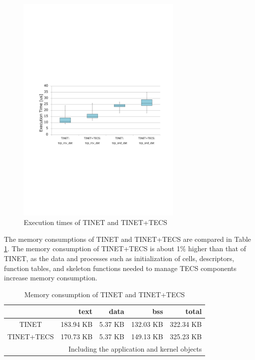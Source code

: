 \documentclass[JIP]{ipsj_v2/UTF8/ipsj}
\begin{document}
\begin{figure}[t]
    \centering
    \includegraphics[width=8cm,clip]{figure/EvaluationOfExecutionTime.pdf}
    \caption{Execution times of TINET and TINET+TECS}
    \label{fig:EvaluationOfExecutionTime}
\end{figure}

The memory consumptions of TINET and TINET+TECS are compared in Table \ref{tab:EvaluationOfMemoryConsumption}.
The memory consumption of TINET+TECS is about 1\% higher than that of TINET, as the data and processes such as initialization of cells, descriptors, function tables, and skeleton functions needed to manage TECS components increase memory consumption.

\begin{table}[t]
    \centering
    \caption{Memory consumption of TINET and TINET+TECS}
    \begin{tabular}{c|r|r|r|r}
        \hline\hline
                    &   text       &  data    &   bss      &  total     \\ \hline
        TINET       &   183.94 KB  &  5.37 KB &  132.03 KB &  322.34 KB \\
        TINET+TECS  &   170.73 KB  &  5.37 KB &  149.13 KB &  325.23 KB \\
        \hline
        \multicolumn{5}{r}{Including the application and kernel objects}
    \end{tabular}
    \label{tab:EvaluationOfMemoryConsumption}
\end{table}
\end{document}
